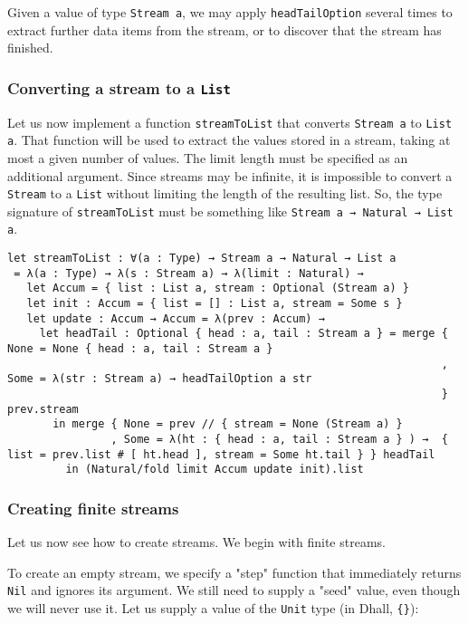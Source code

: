 Given a value of type \lstinline!Stream a!, we may apply \lstinline!headTailOption! several times to extract further data items from the stream, or to discover that the stream has finished.


\subsubsection{Converting a stream to a \lstinline!List!}


Let us now implement a function \lstinline!streamToList! that converts \lstinline!Stream a! to \lstinline!List a!.
That function will be used to extract the values stored in a stream, taking at most a given number of values.
The limit length must be specified as an additional argument.
Since streams may be infinite, it is impossible to convert a \lstinline!Stream! to a \lstinline!List! without limiting the length of the resulting list.
So, the type signature of \lstinline!streamToList! must be something like \lstinline!Stream a → Natural → List a!.


\begin{lstlisting}[language=Dhall]
let streamToList : ∀(a : Type) → Stream a → Natural → List a
 = λ(a : Type) → λ(s : Stream a) → λ(limit : Natural) →
   let Accum = { list : List a, stream : Optional (Stream a) }
   let init : Accum = { list = [] : List a, stream = Some s }
   let update : Accum → Accum = λ(prev : Accum) →
     let headTail : Optional { head : a, tail : Stream a } = merge { None = None { head : a, tail : Stream a }
                                                                   , Some = λ(str : Stream a) → headTailOption a str
                                                                   } prev.stream
       in merge { None = prev // { stream = None (Stream a) }
                , Some = λ(ht : { head : a, tail : Stream a } ) →  { list = prev.list # [ ht.head ], stream = Some ht.tail } } headTail
         in (Natural/fold limit Accum update init).list
\end{lstlisting}


\subsubsection{Creating finite streams}


Let us now see how to create streams.
We begin with finite streams.


To create an empty stream, we specify a "step" function that immediately returns \lstinline!Nil! and ignores its argument.
We still need to supply a "seed" value, even though we will never use it.
Let us supply a value of the \lstinline!Unit! type (in Dhall, \lstinline!{}!):


